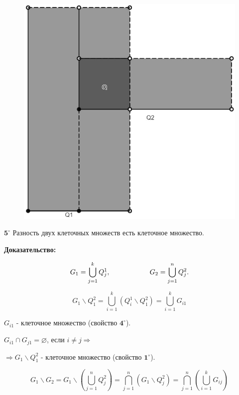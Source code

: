 \documentclass[a4paper,12pt]{article} %
\begin{document}
\begin{figure}[h!]
	\centering
	\includegraphics[scale=0.1]{Q.jpg}
\end{figure} 



$\textbf{5}^\circ$ Разность двух клеточных множеств есть клеточное множество.

\textbf{Доказательство:}

\begin{equation*}
	G_1 = \bigcup_{j = 1}^k Q_j^1, \hspace{20mm} G_2 = \bigcup_{j = 1}^n Q_j^2.
\end{equation*}


\begin{equation*}
	G_1 \backslash Q_1^2 = \bigcup_{i = 1}^k \left(Q_i^1 \backslash Q_1^2\right) = \bigcup_{i = 1}^k G_{i1} 
\end{equation*}


$G_{i1}$ - клеточное множество (свойство $\textbf{4}^\circ$).

$G_{i1} \cap G_{j1} = \varnothing$, если $i \neq j \Rightarrow$

$\Rightarrow G_1 \backslash Q_1^2$ - клеточное множество (свойство $\textbf{1}^\circ$).

\begin{equation*}
	G_1 \backslash G_2 = G_1 \backslash \left( \bigcup_{j = 1}^n Q_j^2\right) = \bigcap_{j = 1}^n\left(G_1 \backslash Q_j^2\right) = \bigcap_{j = 1}^n\left(\bigcup_{i = 1}^k G_{ij}\right)
\end{equation*}
\end{document}
